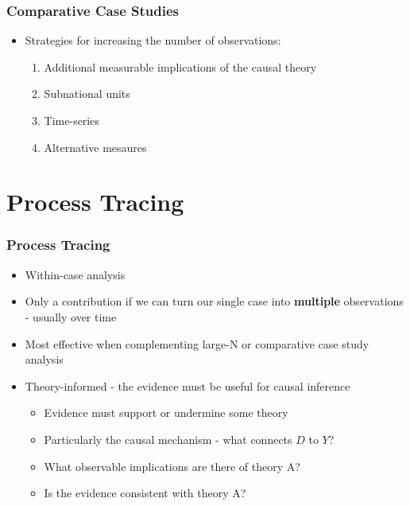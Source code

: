 \documentclass[xcolor=x11names,compress]{beamer}\usepackage[]{graphicx}\usepackage[]{color}
\renewcommand{\(}{\begin{columns}}
\renewcommand{\)}{\end{columns}}
\newcommand{\<}[1]{\begin{column}{#1}}
\renewcommand{\>}{\end{column}}
\begin{document}
\begin{frame}
\frametitle{Comparative Case Studies}
\begin{itemize}
\item Strategies for increasing the number of observations:
\pause
\begin{enumerate}
\item Additional measurable implications of the causal theory
\pause
\item Subnational units
\pause
\item Time-series
\pause
\item Alternative mesaures
\end{enumerate}
\end{itemize}
\end{frame}



\section{Process Tracing} 

\begin{frame}
\frametitle{Process Tracing}
\begin{itemize}
\item Within-case analysis
\pause
\item Only a contribution if we can turn our single case into \textbf{multiple} observations - usually over time
\pause
\item Most effective when complementing large-N or comparative case study analysis
\pause
\item Theory-informed - the evidence must be useful for causal inference
\begin{itemize}
\item Evidence must support or undermine some theory
\pause
\item Particularly the causal mechanism - what connects $D$ to $Y$?
\pause
\item What observable implications are there of theory A?
\pause
\item Is the evidence consistent with theory A?
\end{itemize}
\end{itemize}
\end{frame}
\end{document}
